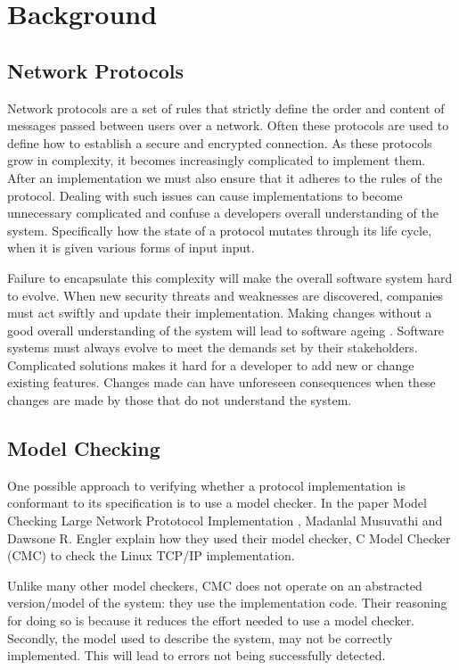\section{Background}

\subsection{Network Protocols}
Network protocols are a set of rules that strictly define the order and content of messages passed between users over a network. Often these protocols are used to define how to establish a secure and encrypted connection. As these protocols grow in complexity, it becomes increasingly complicated to implement them. After an implementation we must also ensure that it adheres to the rules of the protocol. Dealing with such issues can cause implementations to become unnecessary complicated and confuse a developers overall understanding of the system. Specifically how the state of a protocol mutates through its life cycle, when it is given various forms of input input.

Failure to encapsulate this complexity will make the overall software system hard to evolve. When new security threats and weaknesses are discovered, companies must act swiftly and update their implementation. Making changes without a good overall understanding of the system will lead to software ageing \cite{parnas1994software}. Software systems must always evolve to meet the demands set by their stakeholders. Complicated solutions makes it hard for a developer to add new or change existing features. Changes made can have unforeseen consequences when these changes are made by those that do not understand the system.

\subsection{Model Checking}
One possible approach to verifying whether a protocol implementation is conformant to its specification is to use a model checker. In the paper Model Checking Large Network Prototocol Implementation \cite{musuvathi2004model}, Madanlal Musuvathi and Dawsone R. Engler explain how they used their model checker, C Model Checker (CMC) \cite{musuvathi2002cmc} to check the Linux TCP/IP implementation. 

Unlike many other model checkers, CMC does not operate on an abstracted version/model of the system: they use the implementation code. Their reasoning for doing so is because it reduces the effort needed to use a model checker. Secondly, the model used to describe the system, may not be correctly implemented. This will lead to errors not being successfully detected. 

